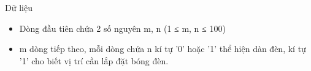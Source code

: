 Dữ liệu
\begin{itemize}
	\item     Dòng đầu tiên chứa 2 số nguyên m, n (1 ≤ m, n ≤ 100)   
	\item     m dòng tiếp theo, mỗi dòng chứa n kí tự '0' hoặc '1' thể hiện dàn đèn, kí tự '1' cho biết vị trí cần lắp đặt bóng đèn.   
\end{itemize}